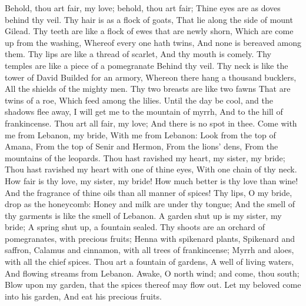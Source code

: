 Behold, thou art fair, my love; behold, thou art fair; Thine eyes are as doves behind thy veil. Thy hair is as a flock of goats, That lie along the side of mount Gilead.  Thy teeth are like a flock of ewes that are newly shorn, Which are come up from the washing, Whereof every one hath twins, And none is bereaved among them.  Thy lips are like a thread of scarlet, And thy mouth is comely. Thy temples are like a piece of a pomegranate Behind thy veil.  Thy neck is like the tower of David Builded for an armory, Whereon there hang a thousand bucklers, All the shields of the mighty men.  Thy two breasts are like two fawns That are twins of a roe, Which feed among the lilies.  Until the day be cool, and the shadows flee away, I will get me to the mountain of myrrh, And to the hill of frankincense.  Thou art all fair, my love; And there is no spot in thee.  Come with me from Lebanon, my bride, With me from Lebanon: Look from the top of Amana, From the top of Senir and Hermon, From the lions’ dens, From the mountains of the leopards.  Thou hast ravished my heart, my sister, my bride; Thou hast ravished my heart with one of thine eyes, With one chain of thy neck.  How fair is thy love, my sister, my bride! How much better is thy love than wine! And the fragrance of thine oils than all manner of spices!  Thy lips, O my bride, drop as the honeycomb: Honey and milk are under thy tongue; And the smell of thy garments is like the smell of Lebanon.  A garden shut up is my sister, my bride; A spring shut up, a fountain sealed.  Thy shoots are an orchard of pomegranates, with precious fruits; Henna with spikenard plants,  Spikenard and saffron, Calamus and cinnamon, with all trees of frankincense; Myrrh and aloes, with all the chief spices.  Thou art a fountain of gardens, A well of living waters, And flowing streams from Lebanon.  Awake, O north wind; and come, thou south; Blow upon my garden, that the spices thereof may flow out. Let my beloved come into his garden, And eat his precious fruits. 

